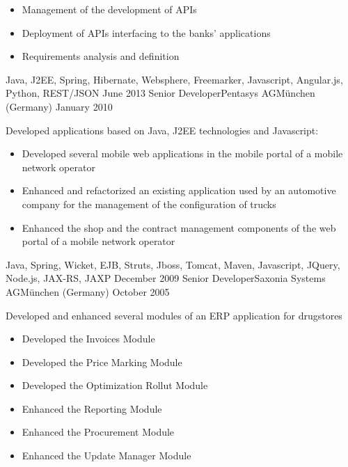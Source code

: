 \begin{experiences}
{\begin{itemize}
                        \item Management of the development of APIs
                        \item Deployment of APIs interfacing to the banks' applications 
                        \item Requirements analysis and definition                                                
                      \end{itemize}
                    }
                    {Java, J2EE, Spring, Hibernate, Websphere, Freemarker, Javascript, Angular.js, Python, REST/JSON}
  \emptySeparator
  \experience
    {June 2013}    {Senior Developer}{Pentasys AG}{München (Germany)}
    {January 2010} {Developed applications based on Java, J2EE technologies and Javascript:   
                      \begin{itemize}
                        \item Developed several mobile web applications in the mobile portal of a mobile network operator
                        \item Enhanced and refactorized an existing application used by an automotive company for the management of the configuration of trucks                 
                        \item Enhanced the shop and the contract management components of the web portal of a mobile network operator
                      \end{itemize}
                    }
                    {Java, Spring, Wicket, EJB, Struts, Jboss, Tomcat, Maven, Javascript, JQuery, Node.js, JAX-RS, JAXP}
  \emptySeparator
  \experience
  {December 2009}   {Senior Developer}{Saxonia Systems AG}{München (Germany)}
  {October 2005}    {
  					    Developed and enhanced several modules of an ERP application for drugstores
  					    \begin{itemize}
                        	\item Developed the Invoices Module
							\item Developed the Price Marking Module
							\item Developed the Optimization Rollut Module
                        	\item Enhanced the Reporting Module
                        	\item Enhanced the Procurement Module
    						\item Enhanced the Update Manager Module
                    	\end{itemize}
  					 }

\end{experiences}
